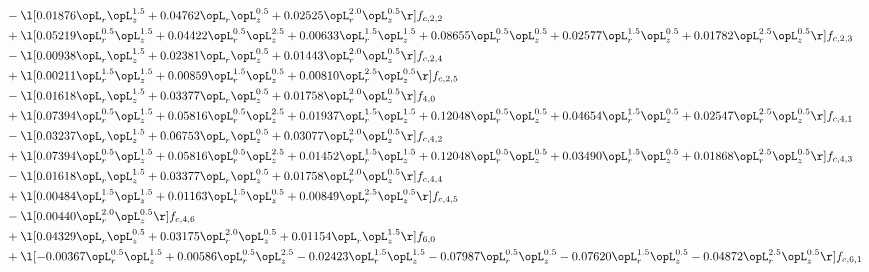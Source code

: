 \begin{alignat}{2}
& - \l[  0.01876 \opL_r \opL_z^{1.5} +  0.04762 \opL_r \opL_z^{0.5} +  0.02525 \opL_r^{2.0} \opL_z^{0.5}  \r] f_{c,2,2} \nonumber \\ 
& + \l[  0.05219 \opL_r^{0.5} \opL_z^{1.5} +  0.04422 \opL_r^{0.5} \opL_z^{2.5} +  0.00633 \opL_r^{1.5} \opL_z^{1.5} +  0.08655 \opL_r^{0.5} \opL_z^{0.5} +  0.02577 \opL_r^{1.5} \opL_z^{0.5} +  0.01782 \opL_r^{2.5} \opL_z^{0.5}  \r] f_{c,2,3} \nonumber \\ 
& - \l[  0.00938 \opL_r \opL_z^{1.5} +  0.02381 \opL_r \opL_z^{0.5} +  0.01443 \opL_r^{2.0} \opL_z^{0.5}  \r] f_{c,2,4} \nonumber \\ 
& + \l[  0.00211 \opL_r^{1.5} \opL_z^{1.5} +  0.00859 \opL_r^{1.5} \opL_z^{0.5} +  0.00810 \opL_r^{2.5} \opL_z^{0.5}  \r] f_{c,2,5} \nonumber \\ 
& - \l[  0.01618 \opL_r \opL_z^{1.5} +  0.03377 \opL_r \opL_z^{0.5} +  0.01758 \opL_r^{2.0} \opL_z^{0.5}  \r] f_{4,0} \nonumber \\ 
& + \l[  0.07394 \opL_r^{0.5} \opL_z^{1.5} +  0.05816 \opL_r^{0.5} \opL_z^{2.5} +  0.01937 \opL_r^{1.5} \opL_z^{1.5} +  0.12048 \opL_r^{0.5} \opL_z^{0.5} +  0.04654 \opL_r^{1.5} \opL_z^{0.5} +  0.02547 \opL_r^{2.5} \opL_z^{0.5}  \r] f_{c,4,1} \nonumber \\ 
& - \l[  0.03237 \opL_r \opL_z^{1.5} +  0.06753 \opL_r \opL_z^{0.5} +  0.03077 \opL_r^{2.0} \opL_z^{0.5}  \r] f_{c,4,2} \nonumber \\ 
& + \l[  0.07394 \opL_r^{0.5} \opL_z^{1.5} +  0.05816 \opL_r^{0.5} \opL_z^{2.5} +  0.01452 \opL_r^{1.5} \opL_z^{1.5} +  0.12048 \opL_r^{0.5} \opL_z^{0.5} +  0.03490 \opL_r^{1.5} \opL_z^{0.5} +  0.01868 \opL_r^{2.5} \opL_z^{0.5}  \r] f_{c,4,3} \nonumber \\ 
& - \l[  0.01618 \opL_r \opL_z^{1.5} +  0.03377 \opL_r \opL_z^{0.5} +  0.01758 \opL_r^{2.0} \opL_z^{0.5}  \r] f_{c,4,4} \nonumber \\ 
& + \l[  0.00484 \opL_r^{1.5} \opL_z^{1.5} +  0.01163 \opL_r^{1.5} \opL_z^{0.5} +  0.00849 \opL_r^{2.5} \opL_z^{0.5}  \r] f_{c,4,5} \nonumber \\ 
& - \l[  0.00440 \opL_r^{2.0} \opL_z^{0.5}  \r] f_{c,4,6} \nonumber \\ 
& + \l[  0.04329 \opL_r \opL_z^{0.5} +  0.03175 \opL_r^{2.0} \opL_z^{0.5} +  0.01154 \opL_r \opL_z^{1.5}  \r] f_{6,0} \nonumber \\ 
& + \l[  -0.00367 \opL_r^{0.5} \opL_z^{1.5} +  0.00586 \opL_r^{0.5} \opL_z^{2.5}   -0.02423 \opL_r^{1.5} \opL_z^{1.5}   -0.07987 \opL_r^{0.5} \opL_z^{0.5}   -0.07620 \opL_r^{1.5} \opL_z^{0.5}   -0.04872 \opL_r^{2.5} \opL_z^{0.5}  \r] f_{c,6,1} \nonumber \\ 

\end{alignat}
